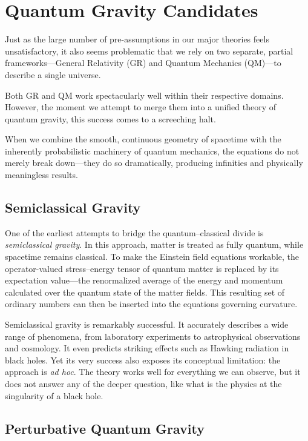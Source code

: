 \chapter{Quantum Gravity Candidates}
\label{chap:quantym-gravity-candidates}

Just as the large number of pre-assumptions in our major theories feels unsatisfactory, it also seems problematic that we rely on two separate, partial frameworks—General Relativity (GR) and Quantum Mechanics (QM)—to describe a single universe.

Both GR and QM work spectacularly well within their respective domains. However, the moment we attempt to merge them into a unified theory of quantum gravity, this success comes to a screeching halt.

When we combine the smooth, continuous geometry of spacetime with the inherently probabilistic machinery of quantum mechanics, the equations do not merely break down—they do so dramatically, producing infinities and physically meaningless results.


\section{Semiclassical Gravity}

One of the earliest attempts to bridge the quantum--classical divide is \emph{semiclassical gravity}. In this approach, matter is treated as fully quantum, while spacetime remains classical. To make the Einstein field equations workable, the operator-valued stress--energy tensor of quantum matter is replaced by its expectation value—the renormalized average of the energy and momentum calculated over the quantum state of the matter fields. This resulting set of ordinary numbers can then be inserted into the equations governing curvature.

Semiclassical gravity is remarkably successful. It accurately describes a wide range of phenomena, from laboratory experiments to astrophysical observations and cosmology. It even predicts striking effects such as Hawking radiation in black holes. Yet its very success also exposes its conceptual limitation: the approach is \emph{ad hoc}.
The theory works well for everything we can observe, but it does not answer any of the deeper question, like what is the physics at the singularity of a black hole.

\section{Perturbative Quantum Gravity}

